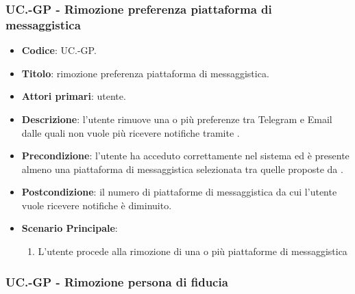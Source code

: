 	\subsubsection{UC\theuccount.\thesubuccount-GP - Rimozione preferenza piattaforma di messaggistica}
	
	\begin{itemize}
		\item \textbf{Codice}: UC\theuccount.\thesubuccount-GP.
		\item \textbf{Titolo}: rimozione preferenza piattaforma di messaggistica.
		\item \textbf{Attori primari}: utente.
		\item \textbf{Descrizione}: l’utente rimuove una o più preferenze tra Telegram e Email dalle	quali non vuole più ricevere notifiche tramite \progetto.
		\item \textbf{Precondizione}: l’utente ha acceduto correttamente nel sistema ed è presente almeno una piattaforma di messaggistica selezionata tra quelle proposte da \progetto.
		\item \textbf{Postcondizione}: il numero di piattaforme di messaggistica da cui l’utente vuole ricevere notifiche è diminuito.
		\item \textbf{Scenario Principale}:
		\begin{enumerate}
			\item L'utente procede alla rimozione di una o più piattaforme di messaggistica
		\end{enumerate}
	\end{itemize}
	
	\subsubsection{UC\theuccount.\thesubuccount-GP - Rimozione persona di fiducia}
	

